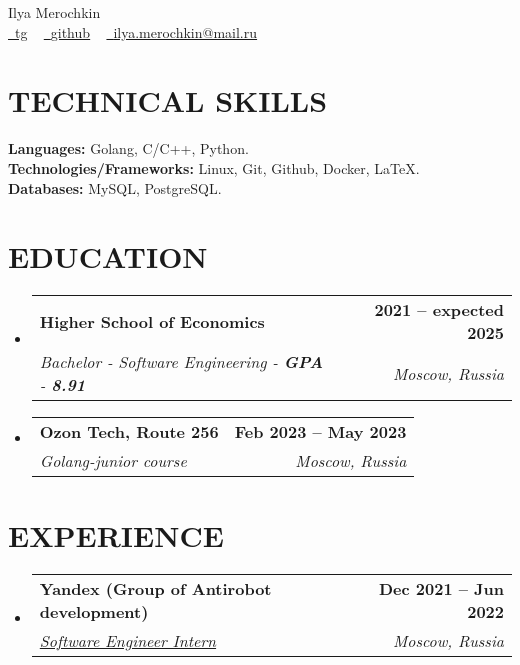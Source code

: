 \documentclass[letterpaper,11pt]{article}
\makeatletter
\newcommand{\resumeSubheading}[4]{
  \vspace{-2pt}\item
    \begin{tabular*}{1.0\textwidth}[t]{l@{\extracolsep{\fill}}r}
      \textbf{\large#1} & \textbf{\small #2} \\
      \textit{\large#3} & \textit{\small #4} \\
      
    \end{tabular*}\vspace{-7pt}
}
\newcommand{\resumeSubHeadingListStart}{\begin{itemize}[leftmargin=0.0in, label={}]}
\newcommand{\resumeSubHeadingListEnd}{\end{itemize}}
\makeatother
\begin{document}


\begin{center}
    {\Huge  Ilya Merochkin} \\ \vspace{10pt}
    \href{https://t.me/ilya_totl}{\raisebox{-0.2\height}\faTelegram\ \underline{tg}} ~
    \href{https://github.com/ilyatotl}{\raisebox{-0.2\height}\faGithub\ \underline{github}} ~
    \href{mailto:fodor.osetrov@gmail.com}{\raisebox{-0.2\height}\faEnvelope\  \underline{ilya.merochkin@mail.ru}} ~ 
    \vspace{-8pt}
\end{center}

\section{TECHNICAL SKILLS}
 \begin{itemize}[leftmargin=0.15in, label={}]
    \small{\item{
     \textbf{\normalsize{Languages:}}{ \normalsize{Golang, C/C++, Python.}} \\
     \textbf{\normalsize{Technologies/Frameworks:}}{\normalsize{ Linux, Git, Github, Docker, LaTeX.}} \\
     \textbf{\normalsize{Databases:}}{\normalsize{ MySQL, PostgreSQL.}} \\
    }}
 \end{itemize}
 \vspace{-15pt}

\section{EDUCATION}
  \resumeSubHeadingListStart
    \resumeSubheading
      {Higher School of Economics}{2021 -- expected 2025}
      {Bachelor - Software Engineering - \textbf{GPA} - \textbf{8.91}}{Moscow, Russia}
    \resumeSubheading
      {Ozon Tech, Route 256}{Feb 2023 -- May 2023}
      {Golang-junior course}{Moscow, Russia}
  \resumeSubHeadingListEnd


\section{EXPERIENCE}
  \resumeSubHeadingListStart

    \resumeSubheading
      {Yandex (Group of Antirobot development) }{Dec 2021 -- Jun 2022} 
      {\underline{Software Engineer Intern}}{Moscow, Russia}
  \resumeSubHeadingListEnd
\vspace{-12pt}
\end{document}
